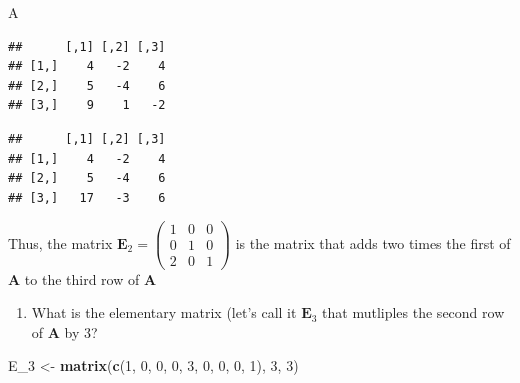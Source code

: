 \documentclass[
]{book}
\newenvironment{Shaded}{\begin{snugshade}}{\end{snugshade}}
\newcommand{\CommentTok}[1]{\textcolor[rgb]{0.56,0.35,0.01}{\textit{#1}}}
\newcommand{\DecValTok}[1]{\textcolor[rgb]{0.00,0.00,0.81}{#1}}
\newcommand{\KeywordTok}[1]{\textcolor[rgb]{0.13,0.29,0.53}{\textbf{#1}}}
\newcommand{\NormalTok}[1]{#1}
\newcommand{\OperatorTok}[1]{\textcolor[rgb]{0.81,0.36,0.00}{\textbf{#1}}}
\newcommand{\StringTok}[1]{\textcolor[rgb]{0.31,0.60,0.02}{#1}}
\providecommand{\tightlist}{%
  \setlength{\itemsep}{0pt}\setlength{\parskip}{0pt}}
\theoremstyle{definition}
\theoremstyle{definition}
\theoremstyle{definition}
\theoremstyle{remark}
\begin{document}
\begin{itemize}
\begin{Shaded}
\begin{Highlighting}[]
\NormalTok{A}
\end{Highlighting}
\end{Shaded}

\begin{verbatim}
##      [,1] [,2] [,3]
## [1,]    4   -2    4
## [2,]    5   -4    6
## [3,]    9    1   -2
\end{verbatim}

\begin{Shaded}
\end{Shaded}

\begin{verbatim}
##      [,1] [,2] [,3]
## [1,]    4   -2    4
## [2,]    5   -4    6
## [3,]   17   -3    6
\end{verbatim}

  Thus, the matrix \(\mathbf{E}_2 = \begin{pmatrix} 1 & 0 & 0 \\ 0 & 1 & 0 \\ 2 & 0 & 1 \end{pmatrix}\) is the matrix that adds two times the first of \(\mathbf{A}\) to the third row of \(\mathbf{A}\)

  \begin{enumerate}
  \def\labelenumi{\arabic{enumi})}
  \setcounter{enumi}{2}
  \tightlist
  \item
    What is the elementary matrix (let's call it \(\mathbf{E}_3\) that mutliples the second row of \(\mathbf{A}\) by 3?
  \end{enumerate}

\begin{Shaded}
\begin{Highlighting}[]
\NormalTok{E_}\DecValTok{3}\NormalTok{ <-}\StringTok{ }\KeywordTok{matrix}\NormalTok{(}\KeywordTok{c}\NormalTok{(}\DecValTok{1}\NormalTok{, }\DecValTok{0}\NormalTok{, }\DecValTok{0}\NormalTok{, }\DecValTok{0}\NormalTok{, }\DecValTok{3}\NormalTok{, }\DecValTok{0}\NormalTok{, }\DecValTok{0}\NormalTok{, }\DecValTok{0}\NormalTok{, }\DecValTok{1}\NormalTok{), }\DecValTok{3}\NormalTok{, }\DecValTok{3}\NormalTok{)}
\end{Highlighting}
\end{Shaded}


\end{itemize}
\end{document}
